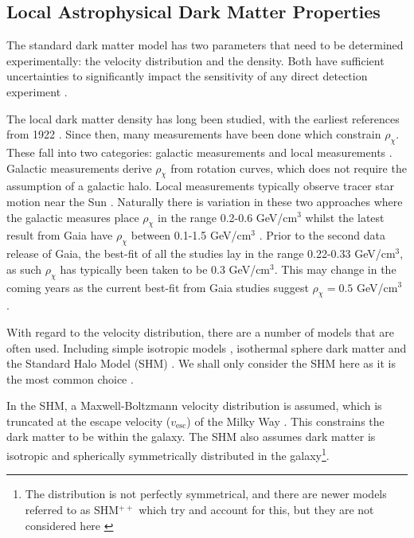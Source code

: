 \subsection{Local Astrophysical Dark Matter Properties}
\par
The standard dark matter model has two parameters that need to be determined experimentally: the velocity distribution and the density. 
Both have sufficient uncertainties to significantly impact the sensitivity of any direct detection experiment \cite{local_dm_uncertainties_ref}.
\par
The local dark matter density has long been studied, with the earliest references from 1922 \cite{first_dm_density_1_ref, first_dm_density_2_ref}.
Since then, many measurements have been done which constrain $\rho_{\chi}$.
These fall into two categories: galactic measurements and local measurements \cite{dm_density_ref}.
Galactic measurements derive $\rho_{\chi}$ from rotation curves, which does not require the assumption of a galactic halo.
Local measurements typically observe tracer star motion near the Sun \cite{gaia_tracer_dm_density_ref}.
Naturally there is variation in these two approaches where the galactic measures place $\rho_{\chi}$ in the range 0.2-0.6 GeV/cm$^3$ whilst the latest result from Gaia \cite{gaia_data_2_ref} have $\rho_{\chi}$ between 0.1-1.5 GeV/cm$^3$ \cite{gaia_dm_density_2_ref}.
Prior to the second data release of Gaia, the best-fit of all the studies lay in the range 0.22-0.33 GeV/cm$^3$, as such $\rho_{\chi}$ has typically been taken to be 0.3 GeV/cm$^3$.
This may change in the coming years as the current best-fit from Gaia studies suggest $\rho_{\chi}=0.5$ GeV/cm$^{3}$ \cite{gaia_dm_density_1_ref}.
\par
With regard to the velocity distribution, there are a number of models that are often used. 
Including simple isotropic models \cite{isotropic_dark_matter_models_ref}, isothermal sphere dark matter \cite{dm_velocity_isothermal_ref} and the Standard Halo Model (SHM) \cite{dm_velocity_shm_ref}. 
We shall only consider the SHM here as it is the most common choice \cite{dark_matter_distribution_models_ref}.
\par
In the SHM, a Maxwell-Boltzmann velocity distribution is assumed, which is truncated at the escape velocity ($v_{\text{esc}}$) of the Milky Way \cite{direct_dark_matter_of_wimps_concepts_ref}.
This constrains the dark matter to be within the galaxy.
The SHM also assumes dark matter is isotropic and spherically symmetrically distributed in the galaxy\footnote{The distribution is not perfectly symmetrical, and there are newer models referred to as SHM$^{++}$ which try and account for this, but they are not considered here \cite{extended_shm_ref}}.
